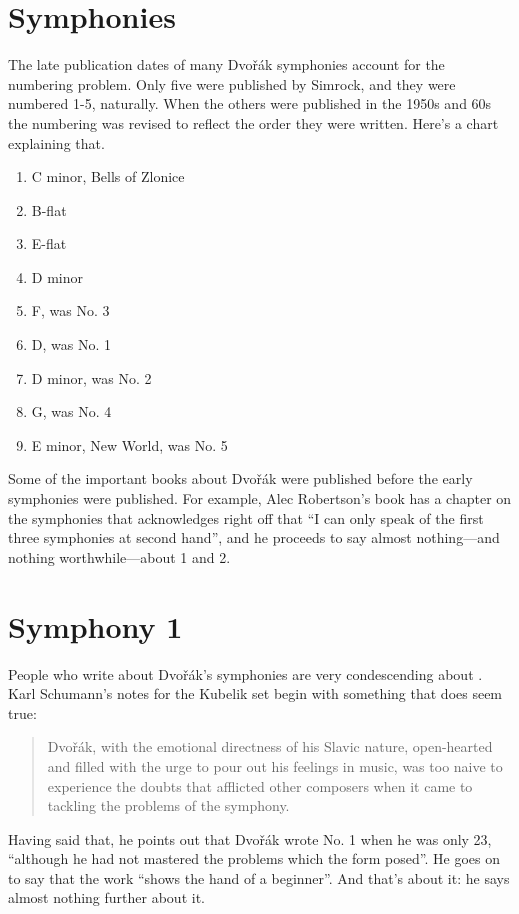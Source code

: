 \documentclass[12pt]{article}%
\begin{document}
\section{Symphonies}
The late publication dates of many Dvořák symphonies account for the numbering problem.
Only five were published by Simrock, and they were numbered 1-5,
naturally. When the others were published in the 1950s and 60s the numbering
was revised to reflect the order they were written. Here's a chart explaining that.

\begin{enumerate}
\setlength{\itemsep}{0pt}
\item C minor, Bells of Zlonice
\item B-flat
\item E-flat
\item D minor
\item F, was No. 3
\item D, was No. 1
\item D minor, was No. 2
\item G, was No. 4
\item E minor, New World, was No. 5
\end{enumerate}
Some of the important books about Dvořák were published before the early symphonies were published. For example, Alec Robertson's book has a chapter on the symphonies that acknowledges right off that ``I can only speak of the first three symphonies at second hand'', and he proceeds to say almost nothing---and nothing worthwhile---about 1 and 2.

\section{Symphony 1}

People who write about Dvořák's symphonies are very condescending about . Karl Schumann's notes for the Kubelik set begin with something that does seem true:
\begin{quote}
Dvořák, with the emotional directness of his Slavic nature, open-hearted and filled with the urge to pour out his feelings in music, was too naive to experience the doubts that afflicted other composers when it came to tackling the problems of the symphony.
\end{quote}
Having said that, he points out that Dvořák wrote No. 1 when he was only 23, ``although he had not mastered the problems which the form posed''. He goes on to say that the work ``shows the hand of a beginner''. And that's about it: he says almost nothing further about it.
\end{document}
